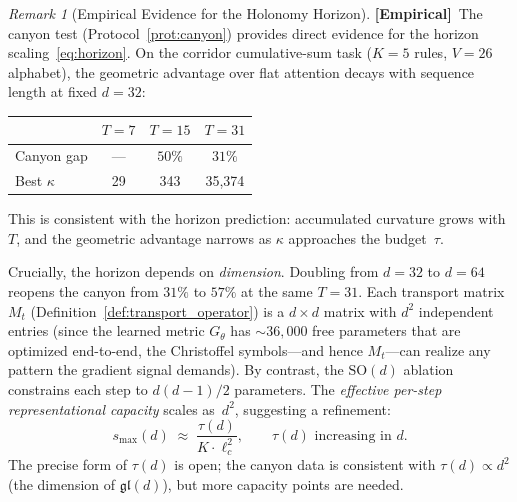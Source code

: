\documentclass[11pt,a4paper]{article}
\theoremstyle{definition}
\theoremstyle{remark}
\newtheorem{remark}[theorem]{Remark}
\newcommand{\SO}{\mathrm{SO}}
\newcommand{\statusempirical}{\textcolor{purple!70!black}{\textbf{[Empirical]}}}
\begin{document}
\begin{remark}[Empirical Evidence for the Holonomy Horizon]%
\label{rem:horizon_empirical}
\statusempirical\ The canyon test 
(Protocol~\ref{prot:canyon}) provides direct evidence for the 
horizon scaling~\eqref{eq:horizon}. On the corridor cumulative-sum 
task ($K = 5$ rules, $V = 26$ alphabet), the geometric advantage 
over flat attention decays with sequence length at fixed $d = 32$:

\begin{center}
\begin{tabular}{lccc}
\toprule
& $T = 7$ & $T = 15$ & $T = 31$ \\
\midrule
Canyon gap & --- & $50\%$ & $31\%$ \\
Best $\kappa$ & 29 & 343 & 35{,}374 \\
\bottomrule
\end{tabular}
\end{center}

This is consistent with the horizon prediction: accumulated 
curvature grows with $T$, and the geometric advantage narrows as 
$\kappa$ approaches the budget~$\tau$.

Crucially, the horizon depends on \emph{dimension}. Doubling from 
$d = 32$ to $d = 64$ reopens the canyon from $31\%$ to $57\%$ at 
the same $T = 31$. Each transport matrix $M_t$ 
(Definition~\ref{def:transport_operator}) is a $d \times d$ matrix 
with $d^2$ independent entries (since the learned metric 
$G_\theta$ has $\sim\!36{,}000$ free parameters that are optimized 
end-to-end, the Christoffel symbols---and hence $M_t$---can 
realize any pattern the gradient signal demands). By contrast, 
the $\SO(d)$ ablation constrains each step to $d(d-1)/2$ 
parameters. The \emph{effective per-step representational capacity} 
scales as~$d^2$, suggesting a refinement:
\begin{equation}\label{eq:horizon_refined}
    s_{\max}(d) \;\approx\; \frac{\tau(d)}{K \cdot \ell_c^2},
    \qquad \tau(d) \text{ increasing in } d.
\end{equation}
The precise form of $\tau(d)$ is open; the canyon data is 
consistent with $\tau(d) \propto d^2$ (the dimension of 
$\mathfrak{gl}(d)$), but more capacity points are needed.
\end{remark}
\end{document}
